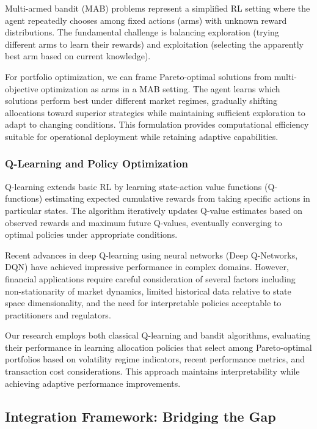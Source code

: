 \documentclass[
  10pt,
  a4paper,
]{article}
\begin{document}
Multi-armed bandit (MAB) problems represent a simplified RL setting
where the agent repeatedly chooses among fixed actions (arms) with
unknown reward distributions. The fundamental challenge is balancing
exploration (trying different arms to learn their rewards) and
exploitation (selecting the apparently best arm based on current
knowledge).

For portfolio optimization, we can frame Pareto-optimal solutions from
multi-objective optimization as arms in a MAB setting. The agent learns
which solutions perform best under different market regimes, gradually
shifting allocations toward superior strategies while maintaining
sufficient exploration to adapt to changing conditions. This formulation
provides computational efficiency suitable for operational deployment
while retaining adaptive capabilities.

\subsubsection{Q-Learning and Policy
Optimization}\label{q-learning-and-policy-optimization}

Q-learning extends basic RL by learning state-action value functions
(Q-functions) estimating expected cumulative rewards from taking
specific actions in particular states. The algorithm iteratively updates
Q-value estimates based on observed rewards and maximum future Q-values,
eventually converging to optimal policies under appropriate conditions.

Recent advances in deep Q-learning using neural networks (Deep
Q-Networks, DQN) have achieved impressive performance in complex
domains. However, financial applications require careful consideration
of several factors including non-stationarity of market dynamics,
limited historical data relative to state space dimensionality, and the
need for interpretable policies acceptable to practitioners and
regulators.

Our research employs both classical Q-learning and bandit algorithms,
evaluating their performance in learning allocation policies that select
among Pareto-optimal portfolios based on volatility regime indicators,
recent performance metrics, and transaction cost considerations. This
approach maintains interpretability while achieving adaptive performance
improvements.

\subsection{Integration Framework: Bridging the
Gap}\label{integration-framework-bridging-the-gap}
\end{document}
